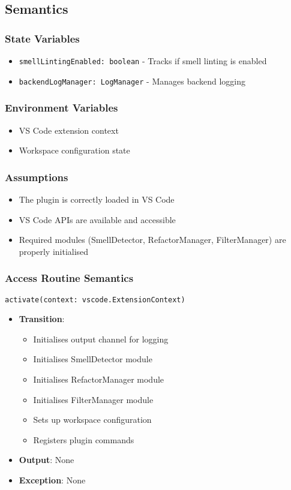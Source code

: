 \documentclass[12pt, titlepage]{article}
\begin{document}
\subsection{Semantics}

\subsubsection{State Variables}
\begin{itemize}
    \item \texttt{smellLintingEnabled: boolean} - Tracks if smell linting is enabled
    \item \texttt{backendLogManager: LogManager} - Manages backend logging
\end{itemize}

\subsubsection{Environment Variables}
\begin{itemize}
    \item VS Code extension context
    \item Workspace configuration state
\end{itemize}

\subsubsection{Assumptions}
\begin{itemize}
    \item The plugin is correctly loaded in VS Code
    \item VS Code APIs are available and accessible
    \item Required modules (SmellDetector, RefactorManager, FilterManager) are properly initialised
\end{itemize}

\subsubsection{Access Routine Semantics}

\noindent\texttt{activate(context: vscode.ExtensionContext)}
\begin{itemize}
    \item \textbf{Transition}: 
    \begin{itemize}
        \item Initialises output channel for logging
        \item Initialises SmellDetector module
        \item Initialises RefactorManager module
        \item Initialises FilterManager module
        \item Sets up workspace configuration
        \item Registers plugin commands
    \end{itemize}
    \item \textbf{Output}: None
    \item \textbf{Exception}: None
\end{itemize}
\end{document}
